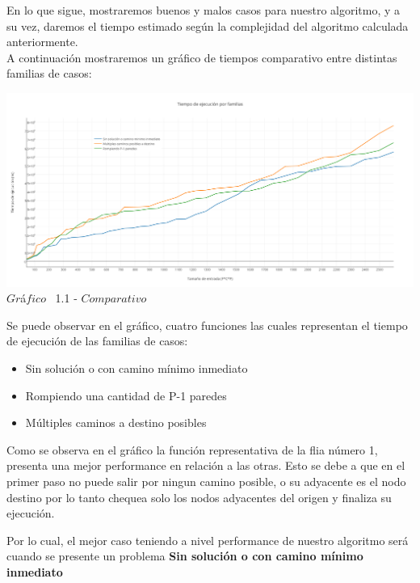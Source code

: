 \indent En lo que sigue, mostraremos buenos y malos casos para nuestro algoritmo, y a su vez, daremos el tiempo estimado 
seg\'un la complejidad del algoritmo calculada anteriormente.\\


A continuaci\'on mostraremos un gr\'afico de tiempos comparativo entre distintas familias de casos:\\ 

\vspace*{0.3cm} \vspace*{0.3cm}
  \begin{center}
 \includegraphics[scale=0.4]{./EJ1/comparativo.png}
 {            $Gr$\'a$fico$ \ 1.1 - $Comparativo$}
  \end{center}
  \vspace*{0.3cm}
  
Se puede observar en el gr\'afico, cuatro funciones las cuales representan el tiempo de ejecuci\'on de las familias de casos:\\
\begin{itemize}
\item Sin soluci\'on o con camino m\'inimo inmediato
\item Rompiendo una cantidad de P-1 paredes
\item M\'ultiples caminos a destino posibles
\end{itemize}


Como se observa en el gr\'afico la funci\'on representativa de la flia n\'umero 1, presenta una mejor performance en relaci\'on a las otras. Esto se debe a que en el primer paso no puede salir por ningun camino posible, o su adyacente es el nodo destino por lo tanto chequea solo los nodos adyacentes del origen y finaliza su ejecuci\'on.

Por lo cual, el mejor caso teniendo a nivel performance de nuestro algoritmo ser\'a cuando se presente un problema \textbf{Sin soluci\'on o con camino m\'inimo inmediato}

